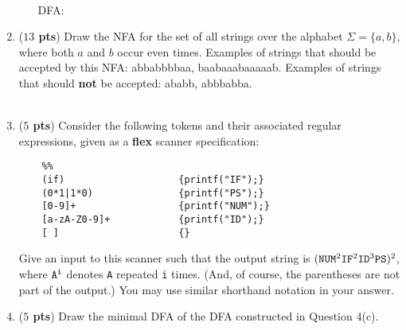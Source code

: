 \documentclass[10pt]{article}
\newcommand {\pts}[1]{({\bf #1 pts})}
\begin{document}
\begin{enumerate}
\begin{enumerate}
    \\
    DFA:
    \\
    \begin{tikzpicture}[shorten >=1pt,node distance=2.6cm,on grid,auto]
    \end{tikzpicture}
  \end{enumerate}

   \newpage
  \item \pts{$13$} Draw the NFA for the set of all strings over the alphabet $\Sigma = \{a,b\}$, where both $a$ and $b$ occur even times.
Examples of strings that should be accepted by this NFA: abbabbbbaa, baabaaabaaaaab.
Examples of strings that should \textbf{not} be accepted: ababb, abbbabba.
    \\
    \\
    \begin{tikzpicture}[shorten >=1pt,node distance=2cm,on grid,auto]
    \end{tikzpicture}

  \newpage
   \item \pts{$5$} Consider the following tokens and their associated regular expressions, given as a \textbf{flex} scanner specification:

  \begin{lstlisting}
    %%
    (if)                    {printf("IF");}
    (0*1|1*0)               {printf("PS");}
    [0-9]+                  {printf("NUM");}
    [a-zA-Z0-9]+            {printf("ID");}
    [ ]                     {}
  \end{lstlisting}

  Give an input to this scanner such that the output string is $\tt (NUM^{\rm 2} IF^{\rm 2} ID^{\rm 3} PS)^{\rm 2}$, where $\tt A^i$ denotes {\tt A} repeated {\tt i} times.   (And, of course, the parentheses are not part of the output.)  You may use similar shorthand notation in your answer.
  \[
  \]

  \newpage
  \item \pts{$5$} Draw the minimal DFA of the DFA constructed in Question 4(c).
   \\
    \\
    \begin{tikzpicture}[shorten >=1pt,node distance=2cm,on grid,auto]
    \end{tikzpicture}

\end{enumerate}
\end{document}
